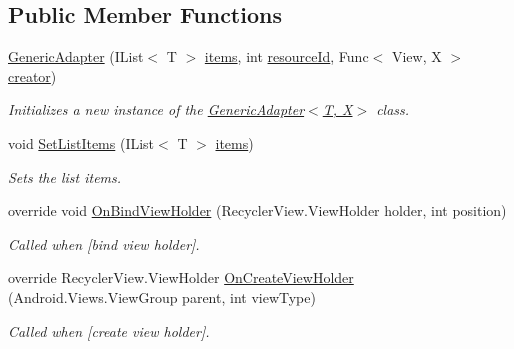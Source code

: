 \subsection*{Public Member Functions}
\begin{DoxyCompactItemize}
\item 
\hyperlink{class_w_c_c_mobile_1_1_adapters_1_1_generic_adapter_af243e0f38786848e559ccaec47243455}{Generic\+Adapter} (I\+List$<$ T $>$ \hyperlink{class_w_c_c_mobile_1_1_adapters_1_1_generic_adapter_a7d82f417d14c6d0027dfb56cd3361c76}{items}, int \hyperlink{class_w_c_c_mobile_1_1_adapters_1_1_generic_adapter_a2adf5c93b6f5abaf8c51e28a9a91c6d3}{resource\+Id}, Func$<$ View, X $>$ \hyperlink{class_w_c_c_mobile_1_1_adapters_1_1_generic_adapter_ad2341fe4f922682e52dc4d86f397868f}{creator})
\begin{DoxyCompactList}\small\item\em Initializes a new instance of the \hyperlink{class_w_c_c_mobile_1_1_adapters_1_1_generic_adapter_af243e0f38786848e559ccaec47243455}{Generic\+Adapter$<$\+T, X$>$} class. \end{DoxyCompactList}\item 
void \hyperlink{class_w_c_c_mobile_1_1_adapters_1_1_generic_adapter_a2737389fa7ce0bf841be29b36aaedd0c}{Set\+List\+Items} (I\+List$<$ T $>$ \hyperlink{class_w_c_c_mobile_1_1_adapters_1_1_generic_adapter_a7d82f417d14c6d0027dfb56cd3361c76}{items})
\begin{DoxyCompactList}\small\item\em Sets the list items. \end{DoxyCompactList}\item 
override void \hyperlink{class_w_c_c_mobile_1_1_adapters_1_1_generic_adapter_a3f0945aae956db3dc6a50c954d93dfd5}{On\+Bind\+View\+Holder} (Recycler\+View.\+View\+Holder holder, int position)
\begin{DoxyCompactList}\small\item\em Called when \mbox{[}bind view holder\mbox{]}. \end{DoxyCompactList}\item 
override Recycler\+View.\+View\+Holder \hyperlink{class_w_c_c_mobile_1_1_adapters_1_1_generic_adapter_a363c83b72c77420b2ec8df91cd98b4fa}{On\+Create\+View\+Holder} (Android.\+Views.\+View\+Group parent, int view\+Type)
\begin{DoxyCompactList}\small\item\em Called when \mbox{[}create view holder\mbox{]}. \end{DoxyCompactList}\end{DoxyCompactItemize}
